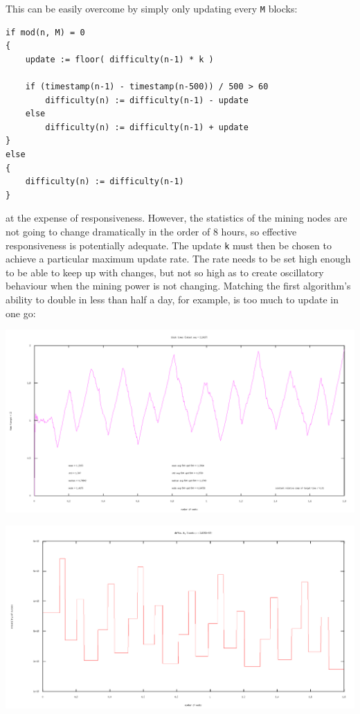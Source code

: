 \documentclass[10pt,a4paper]{article}
\begin{document}
This can be easily overcome by simply only updating every {\tt M} blocks:

\begin{verbatim}
if mod(n, M) = 0
{
    update := floor( difficulty(n-1) * k )

    if (timestamp(n-1) - timestamp(n-500)) / 500 > 60
        difficulty(n) := difficulty(n-1) - update
    else
        difficulty(n) := difficulty(n-1) + update
}
else
{
    difficulty(n) := difficulty(n-1)
}
\end{verbatim}
at the expense of responsiveness. However, the statistics of the mining nodes are not going to change dramatically in the order of 8 hours, so effective responsiveness is potentially adequate. The update {\tt k} must then be chosen to achieve a particular maximum update rate. The rate needs to be set high enough to be able to keep up with changes, but not so high as to create oscillatory behaviour when the mining power is not changing. Matching the first algorithm's ability to double in less than half a day, for example, is too much to update in one go:

\includegraphics[width=14cm]{SimulationGraphs/simulation_avg-500_upd-500_p0-5.png}

\includegraphics[width=14cm]{SimulationGraphs/simulation_avg-500_upd-500_p0-5_diff.png}
\end{document}

